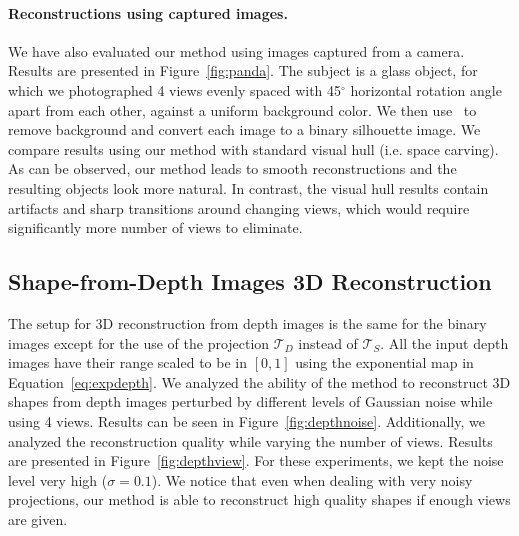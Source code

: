 \paragraph*{Reconstructions using captured images.} We have also evaluated our method using images captured from a camera. Results are presented in Figure~\ref{fig:panda}. The subject is a glass object, for which we photographed 4 views evenly spaced with 45$^\circ$ horizontal rotation angle apart from each other, against a uniform background color. We then use~\cite{clipmagic} to remove background and convert each image to a binary silhouette image. We compare results using our method with standard visual hull (i.e. space carving). As can be observed, our method leads to smooth reconstructions and the resulting objects look more natural. In contrast, the visual hull results contain artifacts and sharp transitions around changing views, which would require significantly more number of views to eliminate.

\subsection{Shape-from-Depth Images 3D Reconstruction}
The setup for 3D reconstruction from depth images is the same for the binary images except for the use of the projection
$\mathcal{T}_D$ instead of $\mathcal{T}_S$.
All the input depth images have their range scaled to be in $[0, 1]$ using the exponential map in Equation~\eqref{eq:expdepth}.
We analyzed the ability of the method to reconstruct 3D shapes from depth images perturbed by different levels of Gaussian noise
while using 4 views.
Results can be seen in Figure~\ref{fig:depthnoise}.
Additionally, we analyzed the reconstruction quality while varying the number of views.
Results are presented in Figure~\ref{fig:depthview}.
For these experiments, we kept the noise level very high ($\sigma=0.1$).
We notice that even when dealing with very noisy projections, our method is able to reconstruct
high quality shapes if enough views are given.




